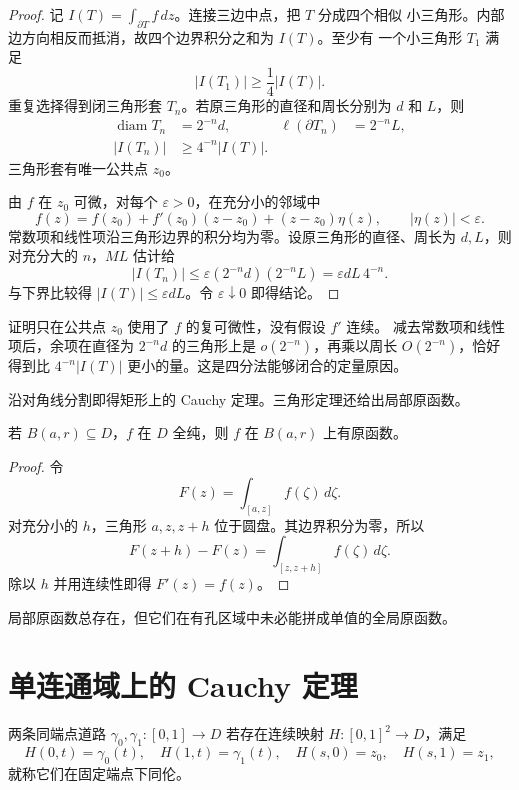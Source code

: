 \begin{proof}
记 \(I(T)=\int_{\partial T}f\,dz\)。连接三边中点，把 \(T\) 分成四个相似
小三角形。内部边方向相反而抵消，故四个边界积分之和为 \(I(T)\)。至少有
一个小三角形 \(T_1\) 满足
\[
 |I(T_1)|\ge\frac14|I(T)|.
\]
重复选择得到闭三角形套 \(T_n\)。若原三角形的直径和周长分别为
\(d\) 和 \(L\)，则
\[
 \begin{aligned}
  \operatorname{diam}T_n&=2^{-n}d,
  &\ell(\partial T_n)&=2^{-n}L,\\
  |I(T_n)|&\ge 4^{-n}|I(T)|.
 \end{aligned}
\]
三角形套有唯一公共点 \(z_0\)。

由 \(f\) 在 \(z_0\) 可微，对每个 \(\varepsilon>0\)，在充分小的邻域中
\[
 f(z)=f(z_0)+f'(z_0)(z-z_0)+(z-z_0)\eta(z),
 \qquad|\eta(z)|<\varepsilon.
\]
常数项和线性项沿三角形边界的积分均为零。设原三角形的直径、周长为
\(d,L\)，则对充分大的 \(n\)，\(ML\) 估计给
\[
 |I(T_n)|\le\varepsilon(2^{-n}d)(2^{-n}L)
 =\varepsilon dL\,4^{-n}.
\]
与下界比较得 \(|I(T)|\le\varepsilon dL\)。令
\(\varepsilon\downarrow0\) 即得结论。
\end{proof}

证明只在公共点 \(z_0\) 使用了 \(f\) 的复可微性，没有假设 \(f'\) 连续。
减去常数项和线性项后，余项在直径为 \(2^{-n}d\) 的三角形上是
\(o(2^{-n})\)，再乘以周长 \(O(2^{-n})\)，恰好得到比
\(4^{-n}|I(T)|\) 更小的量。这是四分法能够闭合的定量原因。

沿对角线分割即得矩形上的 Cauchy 定理。三角形定理还给出局部原函数。

\begin{corollary}[圆盘上的原函数]
\label{cor:holomorphic-local-primitive}
若 \(B(a,r)\subseteq D\)，\(f\) 在 \(D\) 全纯，则 \(f\) 在
\(B(a,r)\) 上有原函数。
\end{corollary}

\begin{proof}
令
\[
 F(z)=\int_{[a,z]}f(\zeta)\,d\zeta.
\]
对充分小的 \(h\)，三角形 \(a,z,z+h\) 位于圆盘。其边界积分为零，所以
\[
 F(z+h)-F(z)=\int_{[z,z+h]}f(\zeta)\,d\zeta.
\]
除以 \(h\) 并用连续性即得 \(F'(z)=f(z)\)。
\end{proof}

局部原函数总存在，但它们在有孔区域中未必能拼成单值的全局原函数。

\section{单连通域上的 Cauchy 定理}

两条同端点道路 \(\gamma_0,\gamma_1:[0,1]\to D\) 若存在连续映射
\(H:[0,1]^2\to D\)，满足
\[
 H(0,t)=\gamma_0(t),\quad H(1,t)=\gamma_1(t),\quad
 H(s,0)=z_0,\quad H(s,1)=z_1,
\]
就称它们在固定端点下同伦。

